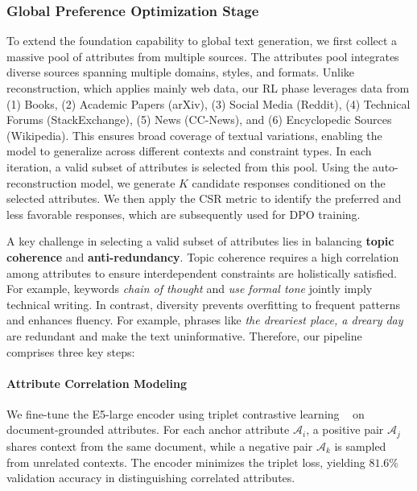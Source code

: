  \subsubsection{Global Preference Optimization Stage}  
 To extend the foundation capability to global text generation, we first collect a massive pool of attributes from multiple sources.
 The attributes pool integrates diverse sources spanning multiple domains, styles, and formats. Unlike reconstruction, which applies mainly web data, our RL phase leverages data from (1) Books, (2) Academic Papers (arXiv), (3) Social Media (Reddit), (4) Technical Forums (StackExchange), (5) News (CC-News), and (6) Encyclopedic Sources (Wikipedia). This ensures broad coverage of textual variations, enabling the model to generalize across different contexts and constraint types.
 In each iteration, a valid subset of attributes is selected from this pool. Using the auto-reconstruction model, we generate $K$ candidate responses conditioned on the selected attributes. We then apply the CSR metric to identify the preferred and less favorable responses, which are subsequently used for DPO training.

A key challenge in selecting a valid subset of attributes lies in balancing \textbf{topic coherence} and \textbf{anti-redundancy}. Topic coherence requires a high correlation among attributes to ensure interdependent constraints are holistically satisfied. For example, keywords \textit{chain of thought} and \textit{use formal tone} jointly imply technical writing. In contrast, diversity prevents overfitting to frequent patterns and enhances fluency. For example, phrases like \textit{the dreariest place, a dreary day} are redundant and make the text uninformative.
Therefore, our pipeline comprises three key steps:
\vspace{-0.5em}
\paragraph{Attribute Correlation Modeling}
We fine-tune the E5-large encoder using triplet contrastive learning ~\cite{simcse} on document-grounded attributes. For each anchor attribute $\mathcal{A}_i$, a positive pair $\mathcal{A}_j$ shares context from the same document, while a negative pair $\mathcal{A}_k$ is sampled from unrelated contexts. The encoder minimizes the triplet loss, yielding $81.6 \%$ validation accuracy in distinguishing correlated attributes.

\vspace{-0.7em}
